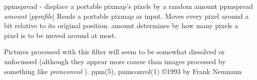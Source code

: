 %

\newpage
%

ppmspread - displace a portable pixmap's pixels by a random amount
ppmspread
{\it amount}
{\rm [}{\it ppmfile}{\rm ]}
Reads a portable pixmap as input. Moves every pixel around a bit
relative to its original position. amount determines by how many
pixels a pixel is to be moved around at most.
\par
Pictures processed with this filter will seem to be somewhat 
dissolved or unfocussed (although they appear more coarse than
images processed by something like
{\it pnmconvol}
).
ppm(5), pnmconvol(1)
\copyright 1993 by Frank Neumann
%

%

\newpage
%

